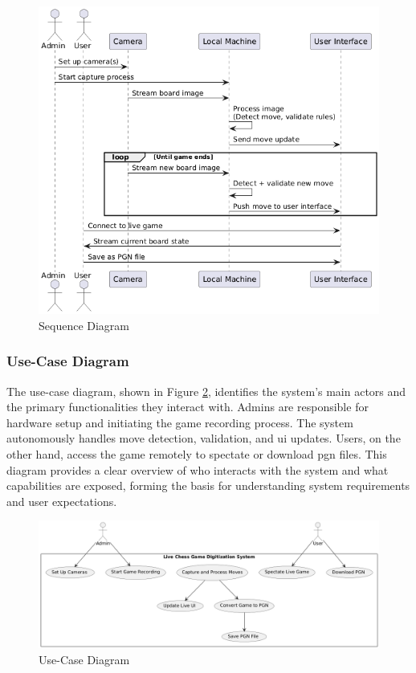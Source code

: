 \newpage

\begin{figure}[h!]
    \centering
    \includegraphics[width=0.75\linewidth]{figures/methods/uml/sequence.png}
    \caption[Sequence Diagram]{Sequence Diagram}
    \label{fig:sequence}
\end{figure}

\subsubsection*{Use-Case Diagram}
\label{subsubsec:use-case-diagram}

The use-case diagram, shown in Figure \ref{fig:use-case}, identifies the system’s main actors and the primary functionalities they interact with. Admins are responsible for hardware setup and initiating the game recording process. The system autonomously handles move detection, validation, and \gls{ui} updates. Users, on the other hand, access the game remotely to spectate or download \gls{pgn} files. This diagram provides a clear overview of who interacts with the system and what capabilities are exposed, forming the basis for understanding system requirements and user expectations.

\begin{figure}[h!]
    \centering
    \includegraphics[width=0.75\linewidth]{figures/methods/uml/use-case.png}
    \caption{Use-Case Diagram}
    \label{fig:use-case}
\end{figure}

